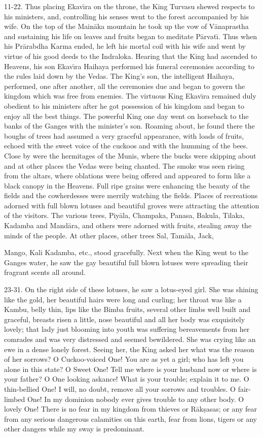 11-22. Thus placing Ekav\={\i}ra on the throne, the King Turvasu shewed respects to his ministers, and, controlling his senses went to the forest accompanied by his wife. On the top of the Main\=aka mountain he took up the vow of V\=anaprastha and sustaining his life on leaves and fruits began to meditate P\=arvat\={\i}. Thus when his Pr\=arabdha Karma ended, he left his mortal coil with his wife and went by virtue of his good deeds to the Indraloka. Hearing that the King had ascended to Heavens, his son Ekav\={\i}ra Haihaya performed his funeral ceremonies according to the rules laid down by the Vedas. The King's son, the intelligent Haihaya, performed, one after another, all the ceremonies due and began to govern the kingdom which was free from enemies. The virtuous King Ekav\={\i}ra remained duly obedient to his ministers after he got possession of his kingdom and began to enjoy all the best things. The powerful King one day went on horseback to the banks of the Ganges with the minister's son. Roaming about, he found there the boughs of trees had assumed a very graceful appearance, with loads of fruits, echoed with the sweet voice of the cuckoos and with the humming of the bees. Close by were the hermitages of the Munis, where the bucks were skipping about and at other places the Vedas were being chanted. The smoke was seen rising from the altars, where oblations were being offered and appeared to form like a black canopy in the Heavens. Full ripe grains were enhancing the beauty of the fields and the cowherdesses were merrily watching the fields. Places of recreations adorned with full blown lotuses and beautiful groves were attracting the attention of the visitors. The various trees, Piy\=ala, Champaka, Panasa, Bakula, Tilaka, Kadamba and Mand\=ara, and others were adorned with fruits, stealing away the minds of the people. At other places, other trees Sal, Tam\=ala, Jack,

Mango, Kali Kadamba, etc., stood gracefully. Next when the King went to the Ganges water, he saw the gay beautiful full blown lotuses were spreading their fragrant scents all around.

23-31. On the right side of these lotuses, he saw a lotus-eyed girl. She was shining like the gold, her beautiful hairs were long and curling; her throat was like a Kambu, belly thin, lips like the Bimba fruits, several other limbs well built and graceful, breasts risen a little, nose beautiful and all her body was exquisitely lovely; that lady just blooming into youth was suffering bereavements from her comrades and was very distressed and seemed bewildered. She was crying like an ewe in a dense lonely forest. Seeing her, the King asked her what was the reason of her sorrows? O Cuckoo-voiced One! You are as yet a girl; who has left you alone in this state? O Sweet One! Tell me where is your husband now or where is your father? O One looking askance! What is your trouble; explain it to me. O thin-bellied One! I will, no doubt, remove all your sorrows and troubles. O fair-limbed One! In my dominion nobody ever gives trouble to any other body. O lovely One! There is no fear in my kingdom from thieves or R\=ak\d{s}asas; or any fear from any serious dangerous calamities on this earth, fear from lions, tigers or any other dangers while my sway is predominant.

